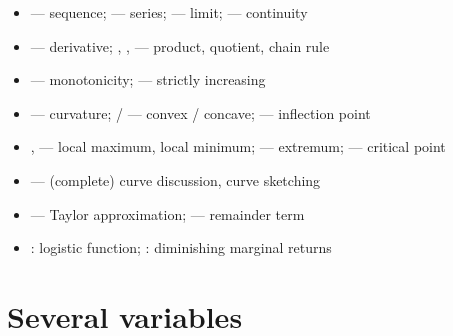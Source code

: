 \begin{itemize}[leftmargin=1.4em,itemsep=0.15ex]
  \item {} --- sequence;  --- series;
         --- limit;  --- continuity
  \item {} --- derivative; ,
        ,  --- product, quotient, chain
        rule
  \item {} --- monotonicity;  ---
        strictly increasing
  \item {} --- curvature;  /  ---
        convex / concave;  --- inflection point
  \item {},  --- local maximum, local minimum;
         --- extremum;  --- critical
        point
  \item {} --- (complete) curve discussion, curve
        sketching
  \item {} --- Taylor approximation;
         --- remainder term
  \item {}: logistic function;
        : diminishing marginal returns
\end{itemize}

\section*{Several variables}

